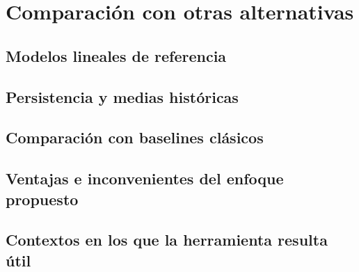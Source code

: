 
\chapter{Comparación con otras alternativas}\label{cap:alternativas}

\section{Modelos lineales de referencia}\label{sec:modelos-lineales}

\section{Persistencia y medias históricas}\label{sec:persistencia-medias}

\section{Comparación con baselines clásicos}\label{sec:baselines-clasicos}

\section{Ventajas e inconvenientes del enfoque propuesto}\label{sec:ventajas-inconvenientes}

\section{Contextos en los que la herramienta resulta útil}\label{sec:contextos-utilidad}
